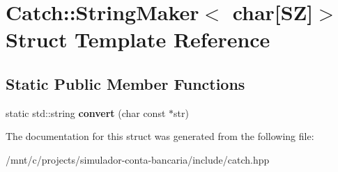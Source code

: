 \hypertarget{structCatch_1_1StringMaker_3_01char[SZ]_4}{}\section{Catch\+:\+:String\+Maker$<$ char\mbox{[}SZ\mbox{]}$>$ Struct Template Reference}
\label{structCatch_1_1StringMaker_3_01char[SZ]_4}
\subsection*{Static Public Member Functions}
\begin{DoxyCompactItemize}
\item 
\mbox{\label{structCatch_1_1StringMaker_3_01char[SZ]_4_a095e415534f9145300271befe9853357}} 
static std\+::string {\bfseries convert} (char const $\ast$str)
\end{DoxyCompactItemize}


The documentation for this struct was generated from the following file\+:\begin{DoxyCompactItemize}
\item 
/mnt/c/projects/simulador-\/conta-\/bancaria/include/catch.\+hpp\end{DoxyCompactItemize}
